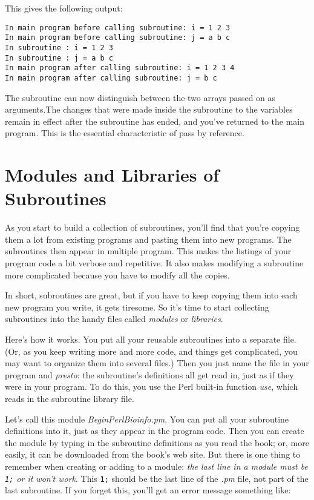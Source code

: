 This gives the following output:

\begin{lstlisting}
In main program before calling subroutine: i = 1 2 3
In main program before calling subroutine: j = a b c
In subroutine : i = 1 2 3
In subroutine : j = a b c
In main program after calling subroutine: i = 1 2 3 4
In main program after calling subroutine: j = b c
\end{lstlisting}

The subroutine can now distinguish between the two arrays passed on as arguments.The changes that were made inside the subroutine to the variables remain in effect after the subroutine has ended, and you've returned to the main program. This is the essential characteristic of pass by reference. 

\section{Modules and Libraries of Subroutines}
As you start to build a collection of subroutines, you'll find that you're copying them a lot from existing programs and pasting them into new programs. The subroutines then appear in multiple program. This makes the listings of your program code a bit verbose and repetitive. It also makes modifying a subroutine more complicated because you have to modify all the copies.

In short, subroutines are great, but if you have to keep copying them into each new program you write, it gets tiresome. So it's time to start collecting subroutines into the handy files called \textit{modules} or \textit{libraries}.

Here's how it works. You put all your reusable subroutines into a separate file. (Or, as you keep writing more and more code, and things get complicated, you may want to organize them into several files.) Then you just name the file in your program and \textit{presto}: the subroutine's definitions all get read in, just as if they were in your program. To do this, you use the Perl built-in function \textit{use}, which reads in the subroutine library file.

Let's call this module \textit{BeginPerlBioinfo.pm}. You can put all your subroutine definitions into it, just as they appear in the program code. Then you can create the module by typing in the subroutine definitions as you read the book; or, more easily, it can be downloaded from the book's web site. But there is one thing to remember when creating or adding to a module: \textit{the last line in a module must be \texttt{1;} or it won't work}. This \verb|1;| should be the last line of the \textit{.pm} file, not part of the last subroutine. If you forget this, you'll get an error message something like: 

